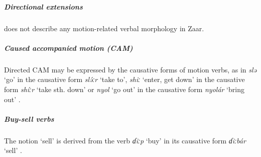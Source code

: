 \subparagraph{Directional extensions}



\citet{caronZaarGrammaticalSketch2011} does not describe any motion-related verbal morphology in Zaar.

\subparagraph{Caused accompanied motion (CAM)}


 
Directed CAM may be expressed by the causative forms of motion verbs, as in \textit{slə} `go' in the causative form \textit{slə́ːr} `take to', \textit{shiː} `enter, get down' in the causative form \textit{shíːr} `take sth. down' or  \textit{nyol} `go out' in the causative form \textit{nyolár} `bring out' \citep[10]{caronZaarGrammaticalSketch2011}.

\subparagraph{Buy-sell verbs}



The notion `sell' is derived from the verb \textit{ɗiːp} `buy' in its causative form \textit{ɗiːbár} `sell' \citep[10]{caronZaarGrammaticalSketch2011}.

